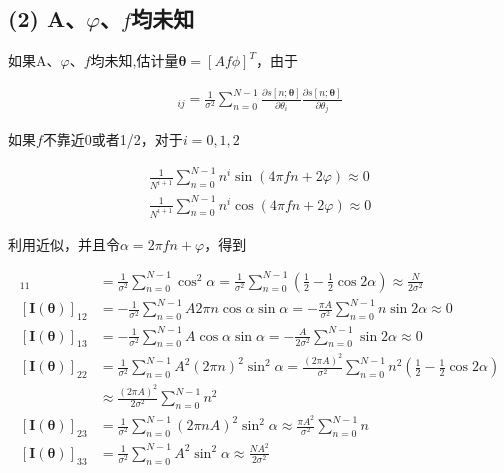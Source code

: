 \documentclass[fontset=windows]{article}
\numberwithin{figure}{section}
\begin{document}
\subsection*{(2) A、\(\varphi\)、\(f\)均未知}
如果A、\(\varphi\)、\(f\)均未知,估计量\(\boldsymbol{\theta}=[Af\phi]^T\)，由于

\begin{align*}
    [\mathbf{I}(\boldsymbol{\theta})]_{ij}=\frac{1}{\sigma^2}\sum_{n=0}^{N-1}
    \frac{\partial s[n;\boldsymbol{\theta}]}{\partial \theta_i}
    \frac{\partial s[n;\boldsymbol{\theta}]}{\partial \theta_j}
\end{align*}

如果\(f\)不靠近0或者1/2，对于\(i=0,1,2\)

\begin{align*}
    \frac{1}{N^{i+1}}\sum_{n=0}^{N-1}n^i\sin(4\pi f n+2\varphi)\approx 0 \\
    \frac{1}{N^{i+1}}\sum_{n=0}^{N-1}n^i\cos(4\pi f n+2\varphi)\approx 0
\end{align*}

利用近似，并且令\(\alpha=2\pi fn+\varphi\)，得到

\begin{align*}
    [\mathbf{I}(\boldsymbol{\theta})]_{11}
     & =\frac{1}{\sigma^2}\sum_{n=0}^{N-1}\cos^2 \alpha
    =\frac{1}{\sigma^2}\sum_{n=0}^{N-1}\left(\frac{1}{2}-\frac{1}{2}\cos2\alpha\right)
    \approx\frac{N}{2\sigma^2}                                           \\
    [\mathbf{I}(\boldsymbol{\theta})]_{12}
     & =-\frac{1}{\sigma^2}\sum_{n=0}^{N-1}A2\pi n \cos\alpha \sin\alpha
    =-\frac{\pi A}{\sigma^2}\sum_{n=0}^{N-1}n\sin 2\alpha
    \approx 0                                                            \\
    [\mathbf{I}(\boldsymbol{\theta})]_{13}
     & =-\frac{1}{\sigma^2}\sum_{n=0}^{N-1}A\cos\alpha \sin\alpha
    =-\frac{A}{2\sigma^2}\sum_{n=0}^{N-1}\sin 2\alpha
    \approx 0                                                            \\
    [\mathbf{I}(\boldsymbol{\theta})]_{22}
     & =\frac{1}{\sigma^2}\sum_{n=0}^{N-1}A^2(2\pi n)^2\sin^2 \alpha
    =\frac{(2\pi A)^2}{\sigma^2}\sum_{n=0}^{N-1}n^2\left(\frac{1}{2}-
    \frac{1}{2}\cos2\alpha\right)                                        \\
     & \approx\frac{(2\pi A)^2}{2\sigma^2}\sum_{n=0}^{N-1}n^2            \\
    [\mathbf{I}(\boldsymbol{\theta})]_{23}
     & =\frac{1}{\sigma^2}\sum_{n=0}^{N-1}(2\pi nA)^2 \sin^2\alpha
    \approx \frac{\pi A^2}{\sigma^2}\sum_{n=0}^{N-1}n                    \\
    [\mathbf{I}(\boldsymbol{\theta})]_{33}
     & =\frac{1}{\sigma^2}\sum_{n=0}^{N-1}A^2\sin^2 \alpha
    \approx \frac{NA^2}{2\sigma^2}
\end{align*}
\end{document}
